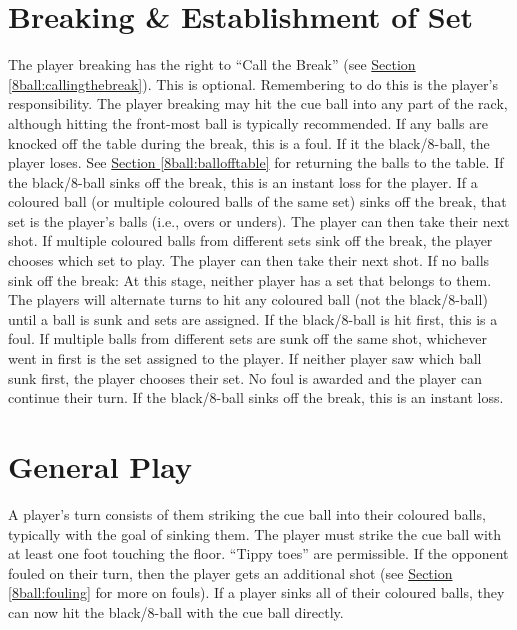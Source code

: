 \section{Breaking \& Establishment of Set} \label{8ball:breaking}
 \CueBallPlacement%
 The player breaking has the right to “Call the Break” (see \hyperref[8ball:callingthebreak]{Section \ref*{8ball:callingthebreak}}). This is optional. Remembering to do this is the player's responsibility.%
 \label{8ball:breakingballs}The player breaking may hit the cue ball into any part of the rack, although hitting the front-most ball is typically recommended.%
 \CueBallMissOffBreak[8ball]%
 \CueBallRailOffBreak%
 \CueBallSinkOffBreak%
 If any balls are knocked off the table during the break, this is a foul. If it the black/8-ball, the player loses. See \hyperref[8ball:ballofftable]{Section \ref*{8ball:ballofftable}} for returning the balls to the table.%
 If the black/8-ball sinks off the break, this is an instant loss for the player.%
 If a coloured ball (or multiple coloured balls of the same set) sinks off the break, that set is the player's balls (i.e., overs or unders). The player can then take their next shot.%
 If multiple coloured balls from different sets sink off the break, the player chooses which set to play. The player can then take their next shot.%
\label{8ball:breakingnoballs}If no balls sink off the break:%
\subruleitem At this stage, neither player has a set that belongs to them. The players will alternate turns to hit any coloured ball (not the black/8-ball) until a ball is sunk and sets are assigned.%
\subruleitem If the black/8-ball is hit first, this is a foul.%
\subruleitem If multiple balls from different sets are sunk off the same shot, whichever went in first is the set assigned to the player. If neither player saw which ball sunk first, the player chooses their set. No foul is awarded and the player can continue their turn.%
 If the black/8-ball sinks off the break, this is an instant loss.%

\section{General Play} \label{8ball:general}
 A player's turn consists of them striking the cue ball into their coloured balls, typically with the goal of sinking them.%
 The player must strike the cue ball with at least one foot touching the floor. “Tippy toes” are permissible.%
 If the opponent fouled on their turn, then the player gets an additional shot (see \hyperref[8ball:fouling]{Section \ref*{8ball:fouling}} for more on fouls).%
 If a player sinks all of their coloured balls, they can now hit the black/8-ball with the cue ball directly.%
 \AlternateTurns[8ball]%

